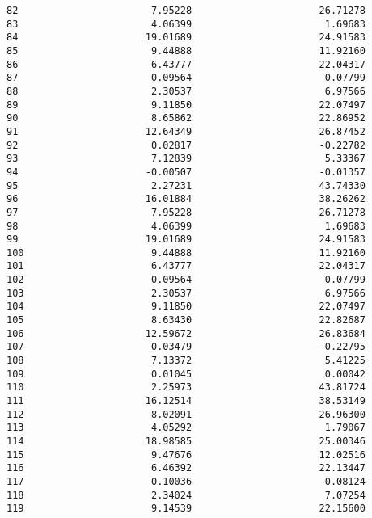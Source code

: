 \documentclass[11pt]{article}
\begin{document}
\begin{tcolorbox}[breakable, size=fbox, boxrule=.5pt, pad at break*=1mm, opacityfill=0]
\begin{Verbatim}[commandchars=\\\{\}]
82                       7.95228                      26.71278
83                       4.06399                       1.69683
84                      19.01689                      24.91583
85                       9.44888                      11.92160
86                       6.43777                      22.04317
87                       0.09564                       0.07799
88                       2.30537                       6.97566
89                       9.11850                      22.07497
90                       8.65862                      22.86952
91                      12.64349                      26.87452
92                       0.02817                      -0.22782
93                       7.12839                       5.33367
94                      -0.00507                      -0.01357
95                       2.27231                      43.74330
96                      16.01884                      38.26262
97                       7.95228                      26.71278
98                       4.06399                       1.69683
99                      19.01689                      24.91583
100                      9.44888                      11.92160
101                      6.43777                      22.04317
102                      0.09564                       0.07799
103                      2.30537                       6.97566
104                      9.11850                      22.07497
105                      8.63430                      22.82687
106                     12.59672                      26.83684
107                      0.03479                      -0.22795
108                      7.13372                       5.41225
109                      0.01045                       0.00042
110                      2.25973                      43.81724
111                     16.12514                      38.53149
112                      8.02091                      26.96300
113                      4.05292                       1.79067
114                     18.98585                      25.00346
115                      9.47676                      12.02516
116                      6.46392                      22.13447
117                      0.10036                       0.08124
118                      2.34024                       7.07254
119                      9.14539                      22.15600


\end{Verbatim}
\end{tcolorbox}
\end{document}
